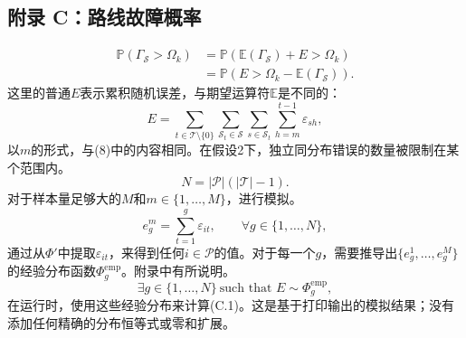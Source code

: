 \documentclass[10pt]{article}
\begin{document}
\subsection*{附录 C：路线故障概率}
\begin{equation}
\begin{aligned}
\mathbb P(\Gamma_{\mathcal S}>\Omega_k)
&=\mathbb P(\mathbb E(\Gamma_{\mathcal S})+E>\Omega_k)\\
&=\mathbb P(E>\Omega_k-\mathbb E(\Gamma_{\mathcal S})).
\end{aligned}\tag{C.1}
\end{equation}
这里的普通$E$表示累积随机误差，与期望运算符$\mathbb E$是不同的：
\begin{equation}
 E=\sum_{t\in\mathcal T\setminus\{0\}}\sum_{\mathcal S_t\in\mathcal S}\sum_{s\in\mathcal S_t}\sum_{h=m}^{t-1}\varepsilon_{sh},
\tag{C.2}
\end{equation}
以$m$的形式，与(8)中的内容相同。在假设2下，独立同分布错误的数量被限制在某个范围内。
\[
 N=|\mathcal P|(|\mathcal T|-1).
\]
对于样本量足够大的$M$和$m\in\{1,\ldots,M\}$，进行模拟。
\begin{equation}
 e^m_g=\sum_{t=1}^{g}\varepsilon_{it},\qquad\forall g\in\{1,\ldots,N\},
\tag{C.3}
\end{equation}
通过从$\Phi'$中提取$\varepsilon_{it}$，来得到任何$i\in\mathcal P$的值。对于每一个$g$，需要推导出$\{e^1_g,\ldots,e^M_g\}$的经验分布函数$\Phi^{\mathrm{emp}}_g$。附录中有所说明。
\[
\exists g\in\{1,\ldots,N\}\ \text{such that }E\sim\Phi^{\mathrm{emp}}_g,
\]
在运行时，使用这些经验分布来计算(C.1)。这是基于打印输出的模拟结果；没有添加任何精确的分布恒等式或零和扩展。
\end{document}
